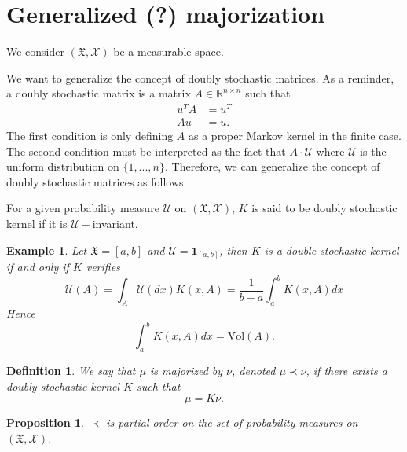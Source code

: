 \documentclass[a4paper]{article}
\newcommand*{\R}{\mathbb{R}}
\newtheorem{definition}{Definition}
\newtheorem{proposition}{Proposition}
\newtheorem{example}{Example}
\begin{document}
\section{Generalized (?) majorization}
We consider \((\mathfrak{X},\mathcal{X})\)  be a measurable space.

We want to generalize the concept of doubly stochastic matrices. As a reminder, a doubly stochastic matrix is a matrix \(A\in\R^{n\times n}\) such that
\begin{align}
    u^TA &= u^T\\
    Au &= u.
\end{align}
The first condition is only defining \(A\) as a proper Markov kernel in the finite case.
The second condition must be interpreted as the fact that \(A\cdot \mathcal{U}\) where \(\mathcal{U}\) is the uniform distribution on \(\{1,...,n\}\).
Therefore, we can generalize the concept of doubly stochastic matrices as follows. 

For a given probability measure \(\mathcal{U}\) on \((\mathfrak{X},\mathcal{X})\), \(K\) is 
said to be doubly stochastic kernel if it is \(\mathcal{U}-\)invariant.

\begin{example} Let \(\mathfrak{X} = [a,b]\) and \(\mathcal{U} = \mathbf{1}_{[a,b]}\), then \(K\) is 
    a double stochastic kernel if and only if \(K\) verifies 
    \begin{equation}
        \mathcal{U}(A) = \int_A \mathcal{U}(dx) K(x,A) = \frac{1}{b-a} \int_a^b K(x,A)dx
    \end{equation}
    Hence 
    \begin{equation}
        \int_a^b K(x,A)dx = \mathrm{Vol}(A).
    \end{equation}
\end{example}

\begin{definition}
    We say that \(\mu\) is majorized by \(\nu\), denoted \(\mu\prec \nu\), if there exists a doubly stochastic kernel \(K\) such that
    \begin{equation}
        \mu = K\nu.
    \end{equation}
\end{definition}
\begin{proposition} \(\prec\) is partial order on the set of probability measures on \((\mathfrak{X},\mathcal{X})\).
\end{proposition}
\end{document}
